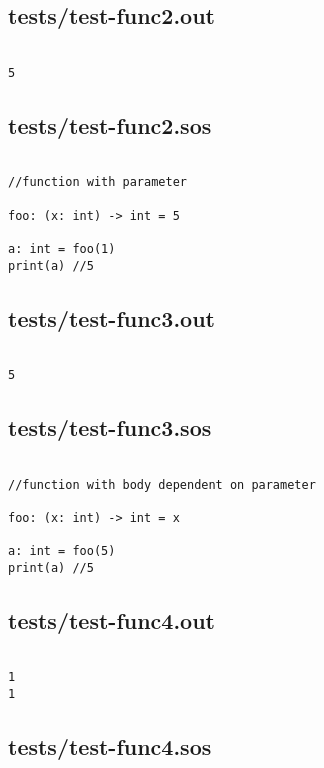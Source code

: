 \documentclass[main.tex]{subfiles}
\begin{document}
\subsection{tests/test-func2.out}

\begin{lstlisting}

5
\end{lstlisting}

\subsection{tests/test-func2.sos}

\begin{lstlisting}

//function with parameter

foo: (x: int) -> int = 5

a: int = foo(1)
print(a) //5
\end{lstlisting}

\subsection{tests/test-func3.out}

\begin{lstlisting}

5
\end{lstlisting}

\subsection{tests/test-func3.sos}

\begin{lstlisting}

//function with body dependent on parameter

foo: (x: int) -> int = x

a: int = foo(5)
print(a) //5
\end{lstlisting}

\subsection{tests/test-func4.out}

\begin{lstlisting}

1
1
\end{lstlisting}

\subsection{tests/test-func4.sos}
\end{document}
